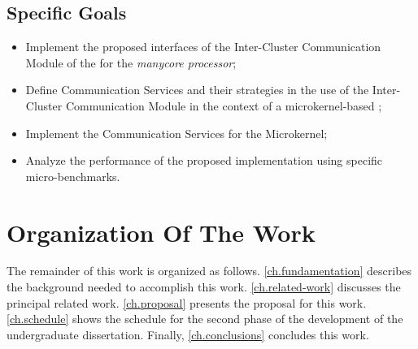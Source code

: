 \subsection{Specific Goals}
\label{sec.goals.specific}

	\begin{itemize}
		\item Implement the proposed interfaces of the Inter-Cluster Communication Module of the \hal 
			for the \textit{\mppa manycore processor};
		\item Define Communication Services and their strategies in the use of the Inter-Cluster
			Communication Module in the context of a microkernel-based \os;
		\item Implement the Communication Services for the \nanvix Microkernel;
		\item Analyze the performance of the proposed implementation using specific micro-benchmarks.
			
	\end{itemize}

\section{Organization Of The Work}
\label{sec.organization}
	
	The remainder of this work is organized as follows.
	\autoref{ch.fundamentation} describes the background needed to accomplish this work.
	\autoref{ch.related-work} discusses the principal related work.
	\autoref{ch.proposal} presents the proposal for this work.
	\autoref{ch.schedule} shows the schedule for the second phase of the
	development of the undergraduate dissertation.
	Finally, \autoref{ch.conclusions} concludes this work.